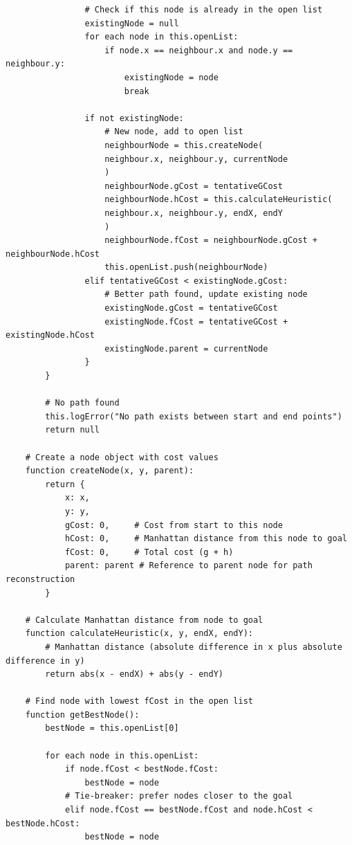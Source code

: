 \begin{verbatim}
                # Check if this node is already in the open list
                existingNode = null
                for each node in this.openList:
                    if node.x == neighbour.x and node.y == neighbour.y:
                        existingNode = node
                        break
                
                if not existingNode:
                    # New node, add to open list
                    neighbourNode = this.createNode(
                    neighbour.x, neighbour.y, currentNode
                    )
                    neighbourNode.gCost = tentativeGCost
                    neighbourNode.hCost = this.calculateHeuristic(
                    neighbour.x, neighbour.y, endX, endY
                    )
                    neighbourNode.fCost = neighbourNode.gCost + neighbourNode.hCost
                    this.openList.push(neighbourNode)
                elif tentativeGCost < existingNode.gCost:
                    # Better path found, update existing node
                    existingNode.gCost = tentativeGCost
                    existingNode.fCost = tentativeGCost + existingNode.hCost
                    existingNode.parent = currentNode
                }
        }
        
        # No path found
        this.logError("No path exists between start and end points")
        return null
    
    # Create a node object with cost values
    function createNode(x, y, parent):
        return {
            x: x,
            y: y,
            gCost: 0,     # Cost from start to this node
            hCost: 0,     # Manhattan distance from this node to goal
            fCost: 0,     # Total cost (g + h)
            parent: parent # Reference to parent node for path reconstruction
        }
    
    # Calculate Manhattan distance from node to goal
    function calculateHeuristic(x, y, endX, endY):
        # Manhattan distance (absolute difference in x plus absolute difference in y)
        return abs(x - endX) + abs(y - endY)
    
    # Find node with lowest fCost in the open list
    function getBestNode():
        bestNode = this.openList[0]
        
        for each node in this.openList:
            if node.fCost < bestNode.fCost:
                bestNode = node
            # Tie-breaker: prefer nodes closer to the goal
            elif node.fCost == bestNode.fCost and node.hCost < bestNode.hCost:
                bestNode = node
        

\end{verbatim}
